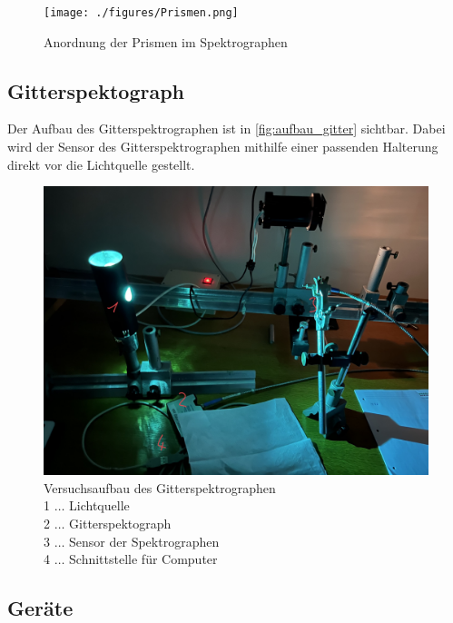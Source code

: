 \documentclass[12pt,english,ngerman]{scrartcl}
\begin{document}
\begin{figure}[H]
	\begin{center}
		\texttt{[image: ./figures/Prismen.png]}
	\end{center}
	\caption[Anordnung der Prismen im Spektrographen]
	{Anordnung der Prismen im Spektrographen
	}\label{fig:prismen}
\end{figure}

\subsection{Gitterspektograph}

Der Aufbau des Gitterspektrographen ist in \autoref{fig:aufbau_gitter} sichtbar. Dabei wird der Sensor des Gitterspektrographen
mithilfe einer passenden Halterung direkt vor die Lichtquelle gestellt.
\begin{figure}[H]
	\begin{center}
		\includegraphics[width =\textwidth]{./figures/Gitterspektograph.png}
	\end{center}
	\caption[Versuchsaufbau des Gitterspektrographen]
	{Versuchsaufbau des Gitterspektrographen \\
	1 \(\dots\) Lichtquelle \\
	2 \(\dots\) Gitterspektograph \\
	3 \(\dots\) Sensor der Spektrographen \\
	4 \(\dots\) Schnittstelle für Computer
	}\label{fig:aufbau_gitter}
\end{figure}


\subsection{Geräte}
\end{document}
